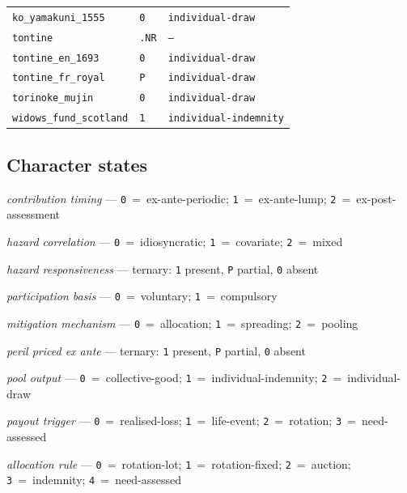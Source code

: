 \documentclass[11pt,a4paper]{article}
\begin{document}
\begin{table}[htbp]
\begin{tabular}{lll}
\texttt{ko\_yamakuni\_1555} & \texttt{0} & \texttt{individual-draw} \\
\texttt{tontine} & \texttt{.NR} & \texttt{--} \\
\texttt{tontine\_en\_1693} & \texttt{0} & \texttt{individual-draw} \\
\texttt{tontine\_fr\_royal} & \texttt{P} & \texttt{individual-draw} \\
\texttt{torinoke\_mujin} & \texttt{0} & \texttt{individual-draw} \\
\texttt{widows\_fund\_scotland} & \texttt{1} & \texttt{individual-indemnity} \\
\bottomrule\end{tabular}\end{table}
\subsection*{Character states}
\begin{description}\setlength{\itemsep}{2pt}
\item[\texttt{CN1}] \textit{contribution timing} — \texttt{0}~=~ex-ante-periodic; \texttt{1}~=~ex-ante-lump; \texttt{2}~=~ex-post-assessment
\item[\texttt{HZ1}] \textit{hazard correlation} — \texttt{0}~=~idiosyncratic; \texttt{1}~=~covariate; \texttt{2}~=~mixed
\item[\texttt{HZ2}] \textit{hazard responsiveness} — ternary: \texttt{1} present, \texttt{P} partial, \texttt{0} absent
\item[\texttt{MB3}] \textit{participation basis} — \texttt{0}~=~voluntary; \texttt{1}~=~compulsory
\item[\texttt{MC1}] \textit{mitigation mechanism} — \texttt{0}~=~allocation; \texttt{1}~=~spreading; \texttt{2}~=~pooling
\item[\texttt{PR1}] \textit{peril priced ex ante} — ternary: \texttt{1} present, \texttt{P} partial, \texttt{0} absent
\item[\texttt{PY0}] \textit{pool output} — \texttt{0}~=~collective-good; \texttt{1}~=~individual-indemnity; \texttt{2}~=~individual-draw
\item[\texttt{PY1}] \textit{payout trigger} — \texttt{0}~=~realised-loss; \texttt{1}~=~life-event; \texttt{2}~=~rotation; \texttt{3}~=~need-assessed
\item[\texttt{PY2}] \textit{allocation rule} — \texttt{0}~=~rotation-lot; \texttt{1}~=~rotation-fixed; \texttt{2}~=~auction; \texttt{3}~=~indemnity; \texttt{4}~=~need-assessed
\end{description}
\end{document}
